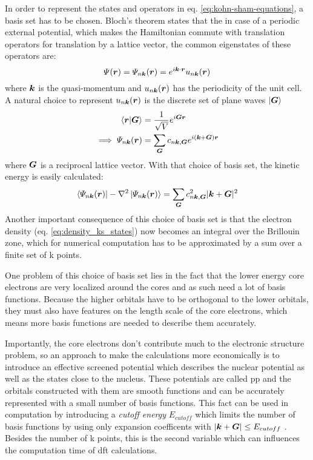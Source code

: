 \documentclass[main.tex]{subfiles}
\begin{document}
In order to represent the states and operators in eq. \ref{eq:kohn-sham-equations}, a basis set has to be chosen.
Bloch's theorem states that the in case of a periodic external potential, which makes the Hamiltonian commute with translation operators for translation by a lattice vector, the common eigenstates of these operators are:
\begin{equation}
    \Psi (\vb*{r}) = \Psi_{n \vb*{k}} (\vb*{r}) = e^{i \vb*{k} \cdot \vb*{r}} u_{n \vb*{k}} (\vb*{r})
\end{equation}
where \(\vb*{k}\) is the quasi-momentum and \(u_{n \vb*{k}} (\vb*{r})\) has the periodicity of the unit cell.
A natural choice to represent \(u_{n \vb*{k}} (\vb*{r})\) is the discrete set of plane waves \(\ket{\vb*{G}}\)
\begin{align}
    \bra{\vb*{r}} \ket{\vb*{G}} &= \frac{1}{\sqrt{V}} e^{i \vb*{G} \vb*{r}} \\
    \implies \Psi_{n \vb*{k}} (\vb*{r}) &= \sum_{\vb*{G}} c_{n \vb*{k}, \vb*{G}} e^{i (\vb*{k} + \vb*{G}) \vb*{r}}
\end{align}
where \(\vb*{G}\) is a reciprocal lattice vector. 
With that choice of basis set, the kinetic energy is easily calculated:
\begin{equation}
    \bra{\Psi_{n \vb*{k}} (\vb*{r})} - \nabla^2 \ket{\Psi_{n \vb*{k}} (\vb*{r})} = \sum_{\vb*{G}} c_{n \vb*{k}, \vb*{G}}^2 \vert \vb*{k} + \vb*{G} \vert^2
\end{equation}
Another important consequence of this choice of basis set is that the electron density (eq. \ref{eq:density_ks_states}) now becomes an integral over the Brillouin zone, which for numerical computation has to be approximated by a sum over a finite set of k points. 

One problem of this choice of basis set lies in the fact that the lower energy core electrons are very localized around the cores and as such need a lot of basis functions.
Because the higher orbitals have to be orthogonal to the lower orbitals, they must also have features on the length scale of the core electrons, which means more basis functions are needed to describe them accurately.

Importantly, the core electrons don't contribute much to the electronic structure problem, so an approach to make the calculations more economically is to introduce an effective screened potential which describes the nuclear potential as well as the states close to the nucleus.
These potentials are called \acrfull{pp} and the orbitals constructed with them are smooth functions and can be accurately represented with a small number of basis functions.
This fact can be used in computation by introducing a \emph{cutoff energy} \(E_{cutoff}\) which limits the number of basis functions by using only expansion coefficents with \(\vert \vb*{k} + \vb*{G} \vert \leq E_{cutoff}\) . Besides the number of k points, this is the second variable which can influences the computation time of \acrshort{dft} calculations.
\end{document}

